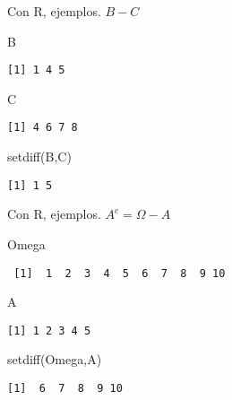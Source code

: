 \documentclass[
  ignorenonframetext,
  aspectratio=169]{beamer}
\newenvironment{Shaded}{\begin{snugshade}}{\end{snugshade}}
\newcommand{\FunctionTok}[1]{\textcolor[rgb]{0.28,0.35,0.67}{#1}}
\newcommand{\NormalTok}[1]{\textcolor[rgb]{0.00,0.23,0.31}{#1}}
\begin{document}
\begin{frame}[fragile]{Con R, ejemplos.}
\protect\hypertarget{con-r-ejemplos.-4}{}
\(B-C\)

\begin{Shaded}
\begin{Highlighting}[]
\NormalTok{B}
\end{Highlighting}
\end{Shaded}

\begin{verbatim}
[1] 1 4 5
\end{verbatim}

\begin{Shaded}
\begin{Highlighting}[]
\NormalTok{C}
\end{Highlighting}
\end{Shaded}

\begin{verbatim}
[1] 4 6 7 8
\end{verbatim}

\begin{Shaded}
\begin{Highlighting}[]
\FunctionTok{setdiff}\NormalTok{(B,C)}
\end{Highlighting}
\end{Shaded}

\begin{verbatim}
[1] 1 5
\end{verbatim}
\end{frame}

\begin{frame}[fragile]{Con R, ejemplos.}
\protect\hypertarget{con-r-ejemplos.-5}{}
\(A^c=\Omega-A\)

\begin{Shaded}
\begin{Highlighting}[]
\NormalTok{Omega}
\end{Highlighting}
\end{Shaded}

\begin{verbatim}
 [1]  1  2  3  4  5  6  7  8  9 10
\end{verbatim}

\begin{Shaded}
\begin{Highlighting}[]
\NormalTok{A}
\end{Highlighting}
\end{Shaded}

\begin{verbatim}
[1] 1 2 3 4 5
\end{verbatim}

\begin{Shaded}
\begin{Highlighting}[]
\FunctionTok{setdiff}\NormalTok{(Omega,A)}
\end{Highlighting}
\end{Shaded}

\begin{verbatim}
[1]  6  7  8  9 10
\end{verbatim}
\end{frame}
\end{document}
